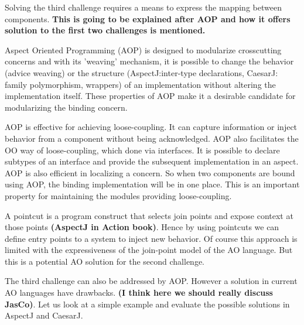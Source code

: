\documentclass{llncs}
\begin{document}
Solving the third challenge requires a means to express the mapping between components.  \textbf{This is going to be explained after AOP
and how it offers solution to the first two challenges is mentioned.}

Aspect Oriented Programming (AOP) is designed to modularize crosscutting
concerns and with its 'weaving' mechanism, it is possible to change the behavior
(advice weaving) or the structure (AspectJ:inter-type declarations, CaesarJ:
family polymorphism, wrappers) of an implementation without altering the
implementation itself. These properties of AOP make it a desirable candidate for modularizing the binding concern.

AOP is effective for achieving loose-coupling. It
can capture information or inject behavior from a component without being
acknowledged. AOP also facilitates the OO way of loose-coupling, which done via
interfaces. It is possible to declare subtypes of an interface and provide the
subsequent implementation in an aspect.  AOP is also efficient in localizing a concern. So when two components are bound using
AOP, the binding implementation will be in one place. This is an important
property for maintaining the modules providing loose-coupling. 

A pointcut is a program construct that selects join points and expose context at
those points \textbf{(AspectJ in Action book)}. Hence by using pointcuts we can
define entry points to a system to inject new behavior. Of course this approach
is limited with the expressiveness of the join-point model of the AO language.
But this is a potential AO solution for the second challenge.

The third challenge can also be addressed by AOP. However a solution in current
AO languages have drawbacks. \textbf{(I think here we should really discuss
JasCo)}. Let us look at a simple example and evaluate the possible solutions in
AspectJ and CaesarJ. 
\end{document}
